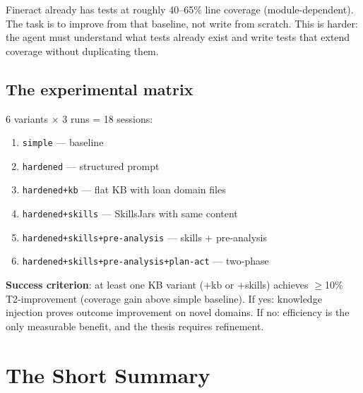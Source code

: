 \documentclass[11pt,a4paper]{article}
\begin{document}
Fineract already has tests at roughly 40--65\% line coverage (module-dependent).
The task is to improve from that baseline, not write from scratch.
This is harder: the agent must understand what tests already exist
and write tests that extend coverage without duplicating them.

\subsection*{The experimental matrix}

6 variants $\times$ 3 runs = 18 sessions:
\begin{enumerate}
  \item \texttt{simple} --- baseline
  \item \texttt{hardened} --- structured prompt
  \item \texttt{hardened+kb} --- flat KB with loan domain files
  \item \texttt{hardened+skills} --- SkillsJars with same content
  \item \texttt{hardened+skills+pre-analysis} --- skills + pre-analysis
  \item \texttt{hardened+skills+pre-analysis+plan-act} --- two-phase
\end{enumerate}

\textbf{Success criterion}: at least one KB variant ($+$kb or $+$skills)
achieves $\geq$10\% T2-improvement (coverage gain above simple baseline).
If yes: knowledge injection proves outcome improvement on novel domains.
If no: efficiency is the only measurable benefit, and the thesis requires refinement.

\section{The Short Summary}
\end{document}
